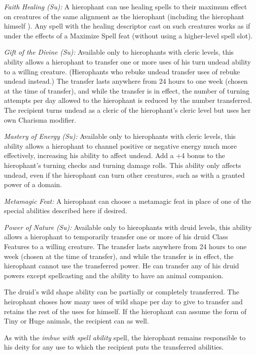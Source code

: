 \documentclass{article}
\begin{document}
\textit{Faith Healing (Su): }A hierophant can use healing spells to their maximum 
effect on creatures of the same alignment as the hierophant (including the hierophant 
himself ). Any spell with the healing descriptor cast on such creatures works as 
if under the effects of a Maximize Spell feat (without using a higher-level spell 
slot).

\textit{Gift of the Divine (Su): }Available only to hierophants with cleric levels, 
this ability allows a hierophant to transfer one or more uses of his turn undead 
ability to a willing creature. (Hierophants who rebuke undead transfer uses of 
rebuke undead instead.) The transfer lasts anywhere from 24 hours to one week (chosen 
at the time of transfer), and while the transfer is in effect, the number of turning 
attempts per day allowed to the hierophant is reduced by the number transferred. 
The recipient turns undead as a cleric of the hierophant's cleric level but uses 
her own Charisma modifier.

\textit{Mastery of Energy (Su): }Available only to hierophants with cleric levels, 
this ability allows a hierophant to channel positive or negative energy much more 
effectively, increasing his ability to affect undead. Add a +4 bonus to the hierophant's 
turning checks and turning damage rolls. This ability only affects undead, even 
if the hierophant can turn other creatures, such as with a granted power of a domain.

\textit{Metamagic Feat: }A hierophant can choose a metamagic feat in place of one 
of the special abilities described here if desired.

\textit{Power of Nature (Su): }Available only to hierophants with druid levels, 
this ability allows a hierophant to temporarily transfer one or more of his druid 
Class Features to a willing creature. The transfer lasts anywhere from 24 hours 
to one week (chosen at the time of transfer), and while the transfer is in effect, 
the hierophant cannot use the transferred power. He can transfer any of his druid 
powers except spellcasting and the ability to have an animal companion.

The druid's wild shape ability can be partially or completely transferred. The 
heirophant choses how many uses of wild shape per day to give to transfer and retains 
the rest of the uses for himself. If the hierophant can assume the form of Tiny 
or Huge animals, the recipient can as well.

As with the \textit{imbue with spell ability }spell, the hierophant remains responsible 
to his deity for any use to which the recipient puts the transferred abilities.
\end{document}

